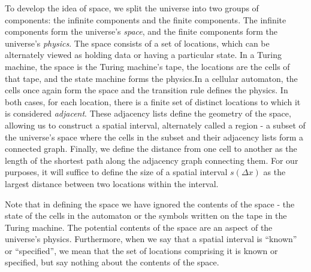 \documentclass[12pt]{article}
\theoremstyle{definition}
\begin{document}
To develop the idea of space, we split the universe into two groups of
components: the infinite components and the finite components. The infinite
components form the universe's \textit{space}, and the finite components form
the universe's \textit{physics}. The space consists of a set of locations, which
can be alternately viewed as holding data or having a particular state. In a
Turing machine, the space is the Turing machine's tape, the locations are the
cells of that tape, and the state machine forms the physics.\footnotemark In a
cellular automaton, the cells once again form the space and the transition rule
defines the physics. In both cases, for each location, there is a finite set of
distinct locations to which it is considered \textit{adjacent}. These adjacency
lists define the geometry of the space, allowing us to construct a spatial
interval, alternately called a region - a subset of the universe's space where
the cells in the subset and their adjacency lists form a connected graph.
Finally, we define the distance from one cell to another as the length of the
shortest path along the adjacency graph connecting them. For our purposes, it
will suffice to define the size of a spatial interval \(s(\Delta x)\) as the
largest distance between two locations within the interval.


Note that in defining the space we have ignored the contents of the space - the
state of the cells in the automaton or the symbols written on the tape in the
Turing machine. The potential contents of the space are an aspect of the
universe's physics. Furthermore, when we say that a spatial interval is
``known'' or ``specified'', we mean that the set of locations comprising it is
known or specified, but say nothing about the contents of the space.

\end{document}

